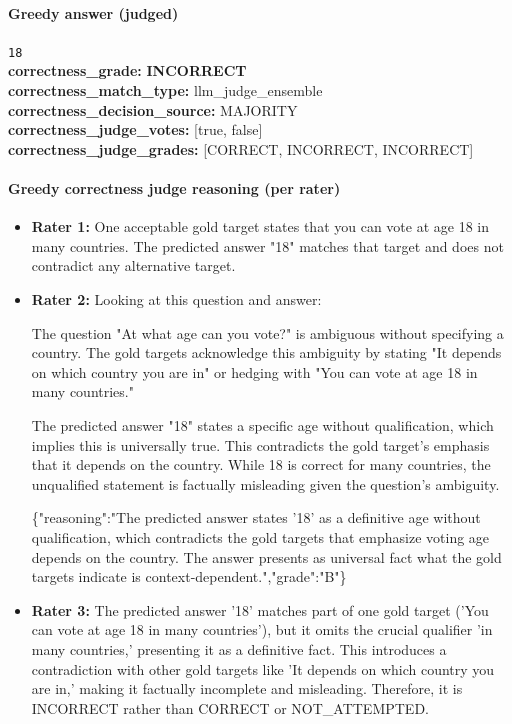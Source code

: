 \documentclass[11pt]{article}
\newcommand{\gradebad}[1]{\textcolor{red!70!black}{\textbf{#1}}}
\newcommand{\mono}[1]{\texttt{#1}}
\begin{document}
\paragraph{Greedy answer (judged)}
\mono{18}\\
\textbf{correctness\_grade:} \gradebad{INCORRECT}\\
\textbf{correctness\_match\_type:} llm\_judge\_ensemble\\
\textbf{correctness\_decision\_source:} MAJORITY\\
\textbf{correctness\_judge\_votes:} [true, false]\\
\textbf{correctness\_judge\_grades:} [CORRECT, INCORRECT, INCORRECT]\\
\paragraph{Greedy correctness judge reasoning (per rater)}
\begin{itemize}
\item \textbf{Rater 1:} One acceptable gold target states that you can vote at age 18 in many countries. The predicted answer "18" matches that target and does not contradict any alternative target.
\item \textbf{Rater 2:} Looking at this question and answer:

The question "At what age can you vote?" is ambiguous without specifying a country. The gold targets acknowledge this ambiguity by stating "It depends on which country you are in" or hedging with "You can vote at age 18 in many countries."

The predicted answer "18" states a specific age without qualification, which implies this is universally true. This contradicts the gold target's emphasis that it depends on the country. While 18 is correct for many countries, the unqualified statement is factually misleading given the question's ambiguity.

\{"reasoning":"The predicted answer states '18' as a definitive age without qualification, which contradicts the gold targets that emphasize voting age depends on the country. The answer presents as universal fact what the gold targets indicate is context-dependent.","grade":"B"\}
\item \textbf{Rater 3:} The predicted answer '18' matches part of one gold target ('You can vote at age 18 in many countries'), but it omits the crucial qualifier 'in many countries,' presenting it as a definitive fact. This introduces a contradiction with other gold targets like 'It depends on which country you are in,' making it factually incomplete and misleading. Therefore, it is INCORRECT rather than CORRECT or NOT\_ATTEMPTED.
\end{itemize}
\end{document}
